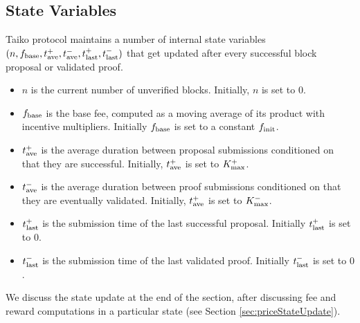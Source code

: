 \documentclass[9pt,oneside]{amsart}
\begin{document}
\begin{multicols}{2}
\subsection{State Variables}
Taiko protocol maintains a number of internal state variables $(n, f_\textnormal{base}, t^+_\textnormal{ave}, t^-_\textnormal{ave}, t^+_\textnormal{last}, t^-_\textnormal{last})$ that get updated after every successful block proposal or validated proof.
\begin{itemize}
    \item $n$ is the current number of unverified blocks. Initially, $n$ is set to $0$.
    \item $f_\textnormal{base}$ is the base fee, computed as a moving average of its product with incentive multipliers. Initially $f_\textnormal{base}$ is set to a constant $f_\textnormal{init}$.
    \item $t^+_\textnormal{ave}$ is the average duration between proposal submissions conditioned on that they are successful. Initially, $t^+_\textnormal{ave}$ is set to $K_\textnormal{max}^+$.
    \item $t^-_\textnormal{ave}$ is the average duration between proof submissions conditioned on that they are eventually validated. Initially, $t^+_\textnormal{ave}$ is set to $K_\textnormal{max}^-$.
    \item $t^+_\textnormal{last}$ is the submission time of the last successful proposal. Initially $t^+_\textnormal{last}$ is set to $0$.
    \item $t^-_\textnormal{last}$ is the submission time of the last validated proof. Initially $t^-_\textnormal{last}$ is set to $0$. 
\end{itemize}
We discuss the state update at the end of the section, after discussing fee and reward computations in a particular state (see Section \ref{sec:priceStateUpdate}). 




    

\end{multicols}
\end{document}
